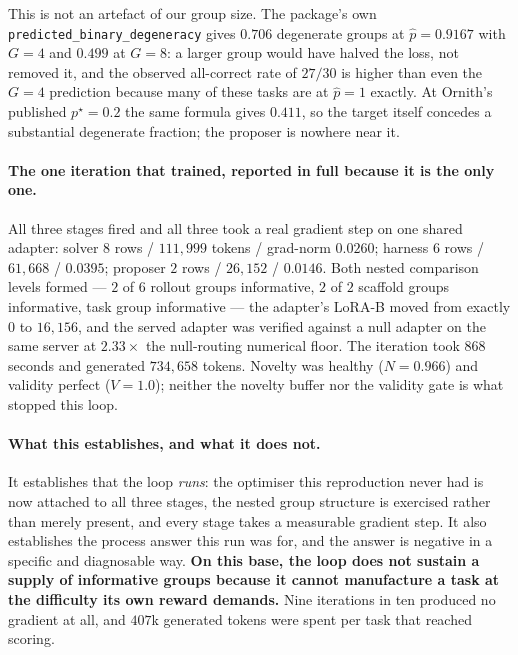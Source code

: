 This is not an artefact of our group size. The package's own
\texttt{predicted\_binary\_degeneracy} gives $0.706$ degenerate groups at $\hat p=0.9167$ with
$G=4$ and $0.499$ at $G=8$: a larger group would have halved the loss, not removed it, and the
observed all-correct rate of $27/30$ is higher than even the $G=4$ prediction because many of
these tasks are at $\hat p=1$ exactly. At Ornith's published $p^\star=0.2$ the same formula
gives $0.411$, so the target itself concedes a substantial degenerate fraction; the proposer
is nowhere near it.

\paragraph{The one iteration that trained, reported in full because it is the only one.}
All three stages fired and all three took a real gradient step on one shared adapter:
solver $8$ rows / $111{,}999$ tokens / grad-norm $0.0260$; harness $6$ rows / $61{,}668$ /
$0.0395$; proposer $2$ rows / $26{,}152$ / $0.0146$. Both nested comparison levels formed ---
$2$ of $6$ rollout groups informative, $2$ of $2$ scaffold groups informative, task group
informative --- the adapter's LoRA-B moved from exactly $0$ to $16{,}156$, and the served
adapter was verified against a null adapter on the same server at $2.33\times$ the
null-routing numerical floor. The iteration took $868$ seconds and generated $734{,}658$
tokens. Novelty was healthy ($N=0.966$) and validity perfect ($V=1.0$); neither the novelty
buffer nor the validity gate is what stopped this loop.

\paragraph{What this establishes, and what it does not.}
It establishes that the loop \emph{runs}: the optimiser this reproduction never had is now
attached to all three stages, the nested group structure is exercised rather than merely
present, and every stage takes a measurable gradient step. It also establishes the process
answer this run was for, and the answer is negative in a specific and diagnosable way.
\textbf{On this base, the loop does not sustain a supply of informative groups because it
cannot manufacture a task at the difficulty its own reward demands.} Nine iterations in ten
produced no gradient at all, and $407$k generated tokens were spent per task that reached
scoring.

